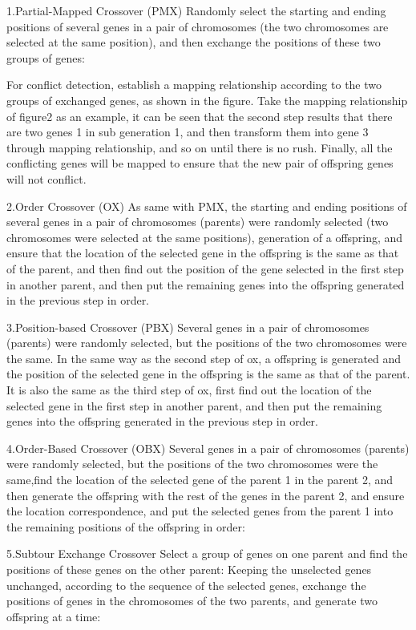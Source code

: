 \documentclass[12pt]{article}
\begin{document}
1.Partial-Mapped Crossover (PMX)
Randomly select the starting and ending positions of several genes in a pair of chromosomes (the two chromosomes are selected at the same position), and then exchange the positions of these two groups of genes:

For conflict detection, establish a mapping relationship according to the two groups of exchanged genes, as shown in the figure. Take the mapping relationship of figure2 as an example, it can be seen that the second step results that there are two genes 1 in sub generation 1, and then transform them into gene 3 through mapping relationship, and so on until there is no rush. Finally, all the conflicting genes will be mapped to ensure that the new pair of offspring genes will not conflict.

2.Order Crossover (OX)
As same with PMX, the starting and ending positions of several genes in a pair of chromosomes (parents) were randomly selected (two chromosomes were selected at the same positions), generation of a offspring, and ensure that the location of the selected gene in the offspring is the same as that of the parent,
and then find out the position of the gene selected in the first step in another parent, and then put the remaining genes into the offspring generated in the previous step in order.


3.Position-based Crossover (PBX)
Several genes in a pair of chromosomes (parents) were randomly selected, but the positions of the two chromosomes were the same. In the same way as the second step of ox, a offspring is generated and the position of the selected gene in the offspring is the same as that of the parent. It is also the same as the third step of ox, first find out the location of the selected gene in the first step in another parent, and then put the remaining genes into the offspring generated in the previous step in order.




4.Order-Based Crossover (OBX)
Several genes in a pair of chromosomes (parents) were randomly selected, but the positions of the two chromosomes were the same,find the location of the selected gene of the parent 1 in the parent 2, and then generate the offspring with the rest of the genes in the parent 2, and ensure the location correspondence, and put the selected genes from the parent 1 into the remaining positions of the offspring in order:



5.Subtour Exchange Crossover
Select a group of genes on one parent and find the positions of these genes on the other parent:
Keeping the unselected genes unchanged, according to the sequence of the selected genes, exchange the positions of genes in the chromosomes of the two parents, and generate two offspring at a time:
\end{document}
